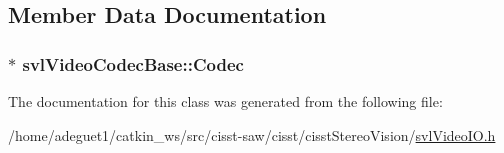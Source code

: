 \subsection{Member Data Documentation}
\hypertarget{classsvl_video_codec_base_a8a6e5b36251d67fbab74399ba965b46a}{
\subsubsection[{Codec}]{$\ast$ svl\-Video\-Codec\-Base\-::\-Codec\hspace{0.3cm}{\ttfamily [protected]}}}\label{classsvl_video_codec_base_a8a6e5b36251d67fbab74399ba965b46a}


The documentation for this class was generated from the following file\-:\begin{DoxyCompactItemize}
\item 
/home/adeguet1/catkin\-\_\-ws/src/cisst-\/saw/cisst/cisst\-Stereo\-Vision/\hyperlink{svl_video_i_o_8h}{svl\-Video\-I\-O.\-h}\end{DoxyCompactItemize}
